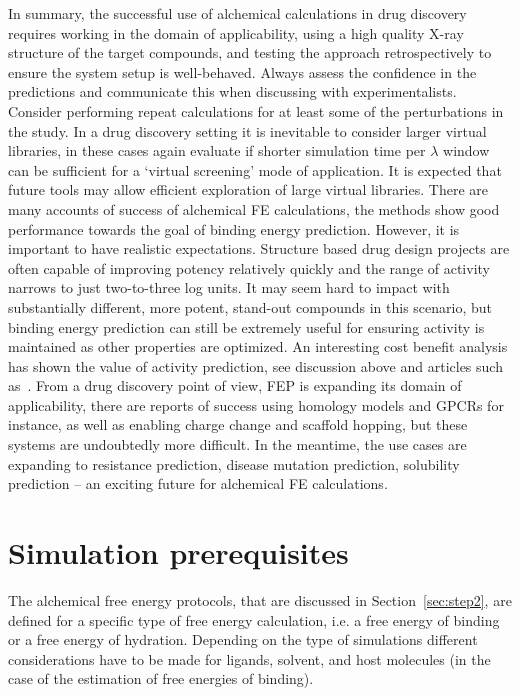 \documentclass[9pt,bestpractices]{livecoms}
\begin{document}
In summary, the successful use of alchemical calculations in drug discovery requires working in the domain of applicability, using a high quality X-ray structure of the target compounds, and testing the approach retrospectively to ensure the system setup is well-behaved. Always assess the confidence in the predictions and communicate this when discussing with experimentalists. Consider performing repeat calculations for at least some of the perturbations in the study. In a drug discovery setting it is inevitable to consider larger virtual libraries, in these cases again evaluate if shorter simulation time per $\lambda$ window can be sufficient for a ‘virtual screening’ mode of application. It is expected that future tools may allow efficient exploration of large virtual libraries. There are many accounts of success of alchemical FE calculations, the methods show good performance towards the goal of binding energy prediction. However, it is important to have realistic expectations. Structure based drug design projects are often capable of improving potency relatively quickly and the range of activity narrows to just two-to-three log units. It may seem hard to impact with substantially different, more potent, stand-out compounds in this scenario, but binding energy prediction can still be extremely useful for ensuring activity is maintained as other properties are optimized. An interesting cost benefit analysis has shown the value of activity prediction, see discussion above and articles such as~\cite{mobley2012perspectiv}. From a drug discovery point of view, FEP is expanding its domain of applicability, there are reports of success using homology models and GPCRs for instance, as well as enabling charge change and scaffold hopping, but these systems are undoubtedly more difficult.  In the meantime, the use cases are expanding to resistance prediction, disease mutation prediction, solubility prediction – an exciting future for alchemical FE calculations. 
%
%
%
%
\section{Simulation prerequisites}
\label{sec:step1}

The alchemical free energy protocols, that are discussed in Section~\ref{sec:step2}, are defined for a specific type of free energy calculation, i.e. a free energy of binding or a free energy of hydration. Depending on the type of simulations different considerations have to be made for ligands, solvent, and host molecules (in the case of the estimation of free energies of binding).
\end{document}
